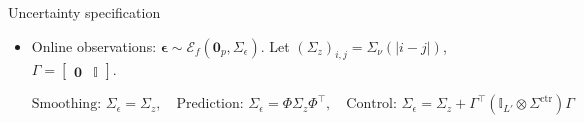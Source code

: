 \documentclass[smaller,aspectratio=169]{beamer}        %
\newcommand{\ellip}[1]{\mathcal{E}_f\left(#1\right)}
\begin{document}
\begin{frame}{Uncertainty specification}
\begin{itemize}
\begin{itemize}
        
        \item Online observations: $\boldsymbol{\epsilon}\sim\ellip{\mathbf{0}_p,\Sigma_\epsilon}$. Let $(\Sigma_z)_{i,j}=\Sigma_\nu(|i-j|)$, $\Gamma=\begin{bmatrix}
            \mathbf{0}&\mathbb{I}
        \end{bmatrix}$.

        \vspace{-0.3em}
        
        \[\text{Smoothing: }\Sigma_\epsilon=\Sigma_z,\quad\text{Prediction: }\Sigma_\epsilon=\Phi\Sigma_z\Phi^\top,\quad\text{Control: }\Sigma_\epsilon=\Sigma_z+\Gamma^\top\left(\mathbb{I}_{L'}\otimes\Sigma^\mathrm{ctr}\right)\Gamma\]
        
    \end{itemize}
    \end{itemize}
\end{frame}
\end{document}
